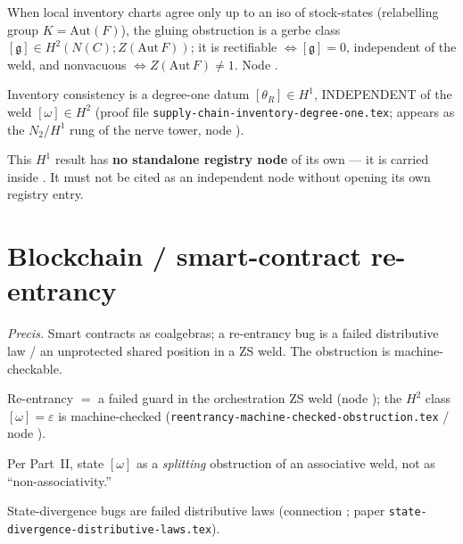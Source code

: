 \documentclass[11pt]{article}
\begin{document}
\begin{theorem}
When local inventory charts agree only up to an iso of stock-states (relabelling group
$K=\mathrm{Aut}(F)$), the gluing obstruction is a gerbe class
$[𝔤]\in H^2(N(C);Z(\mathrm{Aut}\,F))$; it is rectifiable $\iff[𝔤]=0$, independent of the weld, and
nonvacuous $\iff Z(\mathrm{Aut}\,F)\neq1$. Node .
\end{theorem}

\begin{theorem}
Inventory consistency is a degree-one datum $[θ_R]\in H^1$, INDEPENDENT of the weld
$[ω]\in H^2$ (proof file \texttt{supply-chain-inventory-degree-one.tex}; appears as the
$N_2$/$H^1$ rung of the nerve tower, node ).
\end{theorem}
\begin{flag}
This $H^1$ result has \textbf{no standalone registry node} of its own --- it is carried inside
. It must not be cited as an independent  node without
opening its own registry entry.
\end{flag}

\section{Blockchain / smart-contract re-entrancy}
\emph{Precis.} Smart contracts as coalgebras; a re-entrancy bug is a failed distributive law / an
unprotected shared position in a ZS weld. The obstruction is machine-checkable.

\begin{theorem}
Re-entrancy $=$ a failed guard in the orchestration ZS weld (node ); the
$H^2$ class $[ω]=ε$ is machine-checked (\texttt{reentrancy-machine-checked-obstruction.tex} /
node ).
\end{theorem}
\begin{flag}
Per Part~II, state $[ω]$ as a \emph{splitting} obstruction of an associative weld, not as
``non-associativity.''
\end{flag}

\begin{remark}
State-divergence bugs are failed distributive laws (connection
; paper
\texttt{state-divergence-distributive-laws.tex}).
\end{remark}
\end{document}
